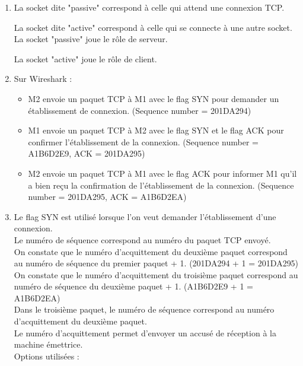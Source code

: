 \documentclass{article}
\begin{document}
\begin{enumerate}[resume]
	\item La socket dite "passive" correspond à celle qui attend une connexion TCP.

La socket dite "active" correspond à celle qui se connecte à une autre socket.\\

La socket "passive" joue le rôle de serveur.

La socket "active" joue le rôle de client.
	
	\item Sur Wireshark : 
\begin{itemize}
		\item M2 envoie un paquet TCP à M1 avec le flag SYN pour demander un établissement de connexion. (Sequence number = 201DA294)
		\item M1 envoie un paquet TCP à M2 avec le flag SYN et le flag ACK pour confirmer l'établissement de la connexion. (Sequence number = A1B6D2E9, ACK = 201DA295)
		\item M2 envoie un paquet TCP à M1 avec le flag ACK pour informer M1 qu'il a bien reçu la confirmation de l'établissement de la connexion. (Sequence number = 201DA295, ACK = A1B6D2EA)
\end{itemize}

	\item 

Le flag SYN est utilisé lorsque l'on veut demander l'établissement d'une connexion.\\

Le numéro de séquence correspond au numéro du paquet TCP envoyé.\\

On constate que le numéro d'acquittement du deuxième paquet correspond au numéro de séquence du premier paquet + 1. (201DA294 + 1 = 201DA295)\\

On constate que le numéro d'acquittement du troisième paquet correspond au numéro de séquence du deuxième paquet + 1. (A1B6D2E9 + 1 = A1B6D2EA)\\

Dans le troisième paquet, le numéro de séquence correspond au numéro d'acquittement du deuxième paquet.\\

Le numéro d'acquittement permet d'envoyer un accusé de réception à la machine émettrice.\\

Options utilisées : 


\end{enumerate}
\end{document}
